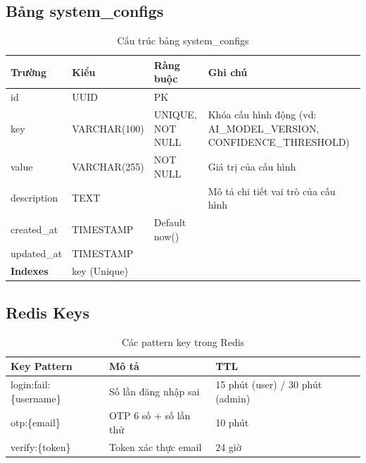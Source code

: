 \documentclass[12pt,a4paper]{article}
\begin{document}
\subsection{Bảng system\_configs}
\begin{longtable}{|l|l|l|p{5.5cm}|}
    \caption{Cấu trúc bảng system\_configs}                                                                                                        \\
    \hline
    \rowcolor{headerblue}
    \textbf{Trường}  & \textbf{Kiểu}                     & \textbf{Ràng buộc} & \textbf{Ghi chú}                                                   \\
    \hline
    id               & UUID                              & PK                 &                                                                    \\
    \hline
    key              & VARCHAR(100)                      & UNIQUE, NOT NULL   & Khóa cấu hình động (vd: AI\_MODEL\_VERSION, CONFIDENCE\_THRESHOLD) \\
    \hline
    value            & VARCHAR(255)                      & NOT NULL           & Giá trị của cấu hình                                               \\
    \hline
    description      & TEXT                              &                    & Mô tả chi tiết vai trò của cấu hình                                \\
    \hline
    created\_at      & TIMESTAMP                         & Default now()      &                                                                    \\
    \hline
    updated\_at      & TIMESTAMP                         &                    &                                                                    \\
    \hline
    \rowcolor{headerblue}
    \textbf{Indexes} & \multicolumn{3}{l|}{key (Unique)}                                                                                           \\
    \hline
\end{longtable}

\subsection{Redis Keys}
\begin{longtable}{|l|p{7.5cm}|l|}
    \caption{Các pattern key trong Redis}                                              \\
    \hline
    \rowcolor{headerblue}
    \textbf{Key Pattern}    & \textbf{Mô tả}        & \textbf{TTL}                     \\
    \hline
    login:fail:\{username\} & Số lần đăng nhập sai  & 15 phút (user) / 30 phút (admin) \\
    \hline
    otp:\{email\}           & OTP 6 số + số lần thử & 10 phút                          \\
    \hline
    verify:\{token\}        & Token xác thực email  & 24 giờ                           \\
    \hline
\end{longtable}
\end{document}
